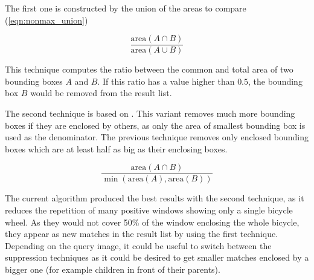 The first one is constructed by the union of the areas to compare (\ref{eqn:nonmax_union})

\begin{equation}
\frac{\text{area}(A \cap B)}{\text{area}(A \cup B)}
\label{eqn:nonmax_union}
\end{equation}

This technique computes the ratio between the common and total area of two bounding boxes $A$ and $B$. If this ratio has a value higher than $0.5$, the bounding box $B$ would be removed from the result list.

The second technique is based on . This variant removes much more bounding boxes if they are enclosed by others, as only the area of smallest bounding box is used as the denominator. The previous technique removes only enclosed bounding boxes which are at least half as big as their enclosing boxes.

\begin{equation}
\frac{\text{area}(A \cap B)}{\min(\text{area}(A), \text{area}(B))}
\label{eqn:nonmax_min}
\end{equation}

The current algorithm produced the best results with the second technique, as it reduces the repetition of many positive windows showing only a single bicycle wheel. As they would not cover 50\% of the window enclosing the whole bicycle, they appear as new matches in the result list by using the first technique. Depending on the query image, it could be useful to switch between the suppression techniques as it could be desired to get smaller matches enclosed by a bigger one (for example children in front of their parents).
